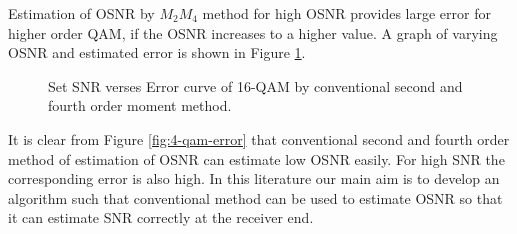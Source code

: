 \documentclass[12pt]{report}
\begin{document}
Estimation of OSNR by $M_2 M_4$ method for high OSNR provides large error for higher order QAM, if the OSNR increases to a higher value. A graph of varying OSNR and estimated error is shown in Figure \ref{fig:standardm2m4error}.
\begin{figure}[htbp]
	\caption{Set SNR verses Error curve of 16-QAM by conventional second and fourth order moment method.}
	\label{fig:standardm2m4error}
\end{figure}

It is clear from Figure \ref{fig:4-qam-error} that conventional second and fourth order method of estimation of OSNR can estimate low OSNR easily. For high SNR the corresponding error is also high. In this literature our main aim is to develop an algorithm such that conventional method can be used to estimate OSNR so that it can estimate SNR correctly at the receiver end.
\end{document}
